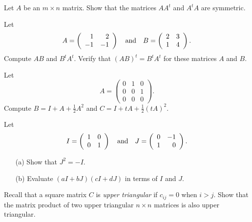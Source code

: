 \EXER


\TEXER


\begin{exercise} \label{c4.7.2.2}
Let $A$ be an $m\times n$ matrix.  Show that the matrices $A A^t$ and
$A^t A$ are symmetric.
\end{exercise}


\begin{exercise} \label{c4.7.3}
Let
\[
A=\left(\begin{array}{rr} 1 & 2\\ -1 &-1\end{array}\right) \quad\mbox{and}\quad B =\left(\begin{array}{rr} 2 & 3\\ 1 &4\end{array}\right).
\]
Compute $AB$ and $B^tA^t$.  Verify that $(AB)^t=B^tA^t$ for these
matrices $A$ and $B$.
\end{exercise}

\begin{exercise} \label{c4.7.4}
Let
\[
A = \left(\begin{array}{ccc} 0 & 1 & 0\\ 0 & 0 & 1 \\ 0 & 0 & 0 \end{array}
\right).
\]
Compute $B=I+A+\frac{1}{2}A^2$ and $C=I+tA+\frac{1}{2}(tA)^2$.
\end{exercise}

\begin{exercise} \label{c4.7.5}
Let
\[
I = \left(\begin{array}{rr} 1 & 0\\ 0 &1\end{array}\right) \quad\mbox{and}\quad J =\left(\begin{array}{rr} 0 & -1\\ 1 &0\end{array}\right).
\]
\begin{itemize}
\item[(a)] Show that $J^2=-I$.
\item[(b)] Evaluate $(aI+bJ)(cI+dJ)$ in terms of $I$ and $J$.
\end{itemize}
\end{exercise}

\begin{exercise} \label{c4.7.8}
Recall that a square matrix $C$ is {\em upper triangular\/} if $c_{ij}=0$
when $i>j$.  Show that the matrix product of two upper triangular $n\times n$
matrices is also upper triangular.
\end{exercise}


\CEXER


